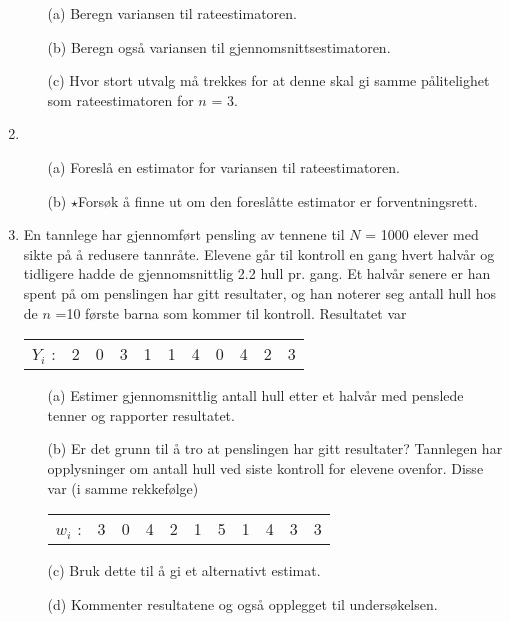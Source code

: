 \begin{enumerate}
\begin{itemize}
\item[(a)]  Beregn variansen til rateestimatoren.
\item[(b)]  Beregn også variansen til gjennomsnittsestimatoren.
\item[(c)]  Hvor stort utvalg må trekkes for at denne skal gi samme 
pålitelighet som rateestimatoren for $n$ = 3.
\end{itemize}

\item  
\begin{itemize}
\item[(a)]  Foreslå en estimator for variansen til rateestimatoren.
\item[(b)] $\star$Forsøk å finne ut om den foreslåtte estimator er 
forventningsrett.
\end{itemize}

\item  En tannlege har gjennomført pensling av tennene til $N$ = 1000 
elever med sikte på å redusere tannråte.  Elevene går til
kontroll en gang hvert halvår og tidligere hadde de gjennomsnittlig
2.2 hull pr. gang.  Et halvår senere er han spent på om penslingen
har gitt resultater, og han noterer seg antall hull hos de $n$ =10 første
barna som kommer til kontroll.  Resultatet var
\begin{center}
\begin{tabular}{lcccccccccc}
 $Y_i$ :   &  2  &  0  &  3  &  1  &  1  &  4  &  0  &  4  &  2  &  3
\end{tabular}
\end{center}
\begin{itemize}
\item[(a)]  Estimer gjennomsnittlig antall hull etter et halvår med
penslede tenner og rapporter resultatet.
\item[(b)]  Er det grunn til å tro at penslingen har gitt resultater?
Tannlegen har opplysninger om antall hull ved siste kontroll for elevene
ovenfor.  Disse var (i samme rekkefølge)

\begin{center}

\begin{tabular}{ccccccccccc}
 $w_i$ :   &  3  &  0  &  4  &  2  &  1  &  5  &  1  &  4  &  3  &  3
\end{tabular}
\end{center}
\item[(c)]  Bruk dette til å gi et alternativt estimat.
\item[(d)]  Kommenter resultatene og også opplegget til undersøkelsen.
\end{itemize}


\end{enumerate}
